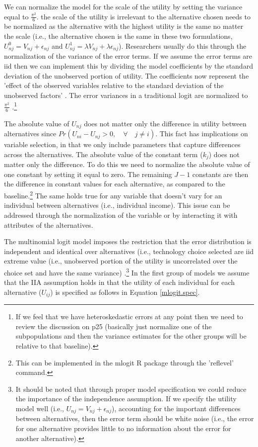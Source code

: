\documentclass[10pt]{amsart}
\begin{document}
We can normalize the model for the scale of the utility by setting the variance equal to $\frac{\pi^2}{6}$. 
the scale of the utility is irrelevant to the alternative chosen  needs to be normalized as the alternative with the highest utility is the same no matter the scale (i.e., the alternative chosen is the same in these two formulations, $U^0_{nj} = V_{nj} + \epsilon_{nj}$ and $U^1_{nj} = \lambda V_{nj} + \lambda \epsilon_{nj}$).
Researchers usually do this through the normalization of the variance of the error terms. 
If we assume the error terms are iid then we can implement this by dividing the model coefficients by the standard deviation of the unobserved portion of utility.
The coefficients now represent the 'effect of the observed variables relative to the standard deviation of the unobserved factors' \parencite[24]{train:2009aa}.  
The error variances in a traditional logit are normalized to $\frac{\pi^2}{6}$ \parencite{train:2009aa}.\footnote{If we feel that we have heteroskedastic errors at any point then we need to review the discussion on p25 (basically just normalize one of the subpopulations and then the variance estimates for the other groups will be relative to that baseline).} 

The absolute value of $U_{nj}$ does not matter only the difference in utility between alternatives since $Pr(U_{ni} -U_{nj} > 0, \quad \forall \quad j \neq i)$.
This fact has implications on variable selection, in that we only include parameters that capture differences across the alternatives. 
The absolute value of the constant term ($k_{j}$) does not matter only the difference.
To do this we need to normalize the absolute value of one constant by setting it equal to zero.
The remaining $J-1$ constants are then the difference in constant values for each alternative, as compared to the baseline.\footnote{This can be implemented in the mlogit R package through the 'reflevel' command.}    
The same holds true for any variable that doesn't vary for an individual between alternatives (i.e., individual income).
This issue can be addressed through the normalization of the variable or by interacting it with attributes of the alternatives. 

The multinomial logit model imposes the restriction that the error distribution is independent and identical over alternatives (i.e., technology choice selected are iid extreme value (i.e., unobserved portion of the utility is uncorrelated over the choice set and have the same variance) \parencite{wen2001generalized}.\footnote{It should be noted that through proper model specification we could reduce the importance of the independence assumption. 
If we specify the utility model well (i.e., $U_{nj} = V_{nj} + \epsilon_{nj}$), accounting for the important differences between alternatives, then the error term should be white noise (i.e., the error for one alternative provides little to no information about the error for another alternative).} 
In the first group of models we assume that the IIA assumption holds in that the utility of each individual for each alternative ($U_{ij}$) is specified as follows in Equation \ref{mlogit.spec}.
\end{document}

